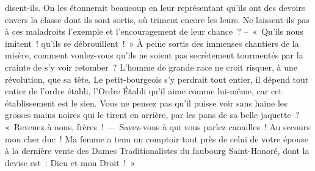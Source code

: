 \documentclass[french,twoside]{book} %
\newcommand{\astertri}{\medskip\par\centerline{\color{rubric}\large\selectfont{\syms ✻\,✻\,✻}}\medskip\par}%
\begin{document}
disent-ils. On les étonnerait beaucoup en leur représentant qu’ils ont des devoirs envers la classe dont ils sont sortis, où triment encore les leurs. Ne laissent-ils pas à ces maladroits l’exemple et l’encouragement de leur chance ? – « Qu’ils nous imitent ! qu’ils se débrouillent ! » À peine sortis des immenses chantiers de la misère, comment voulez-vous qu’ils ne soient pas secrètement tourmentés par la crainte de s’y voir retomber ? L’homme de grande race ne croit risquer, à une révolution, que sa tête. Le petit-bourgeois s’y perdrait tout entier, il dépend tout entier de l’ordre établi, l’Ordre Établi qu’il aime comme lui-même, car cet établissement est le sien. Vous ne pensez pas qu’il puisse voir sans haine les grosses mains noires qui le tirent en arrière, par les pans de sa belle jaquette ? « Revenez à nous, frères ! — Savez-vous à qui vous parlez canailles ! Au secours mon cher duc ! Ma femme a tenu un comptoir tout près de celui de votre épouse à la dernière vente des Dames Traditionalistes du faubourg Saint-Honoré, dont la devise est : Dieu et mon Droit ! »\par

\astertri
\end{document}
